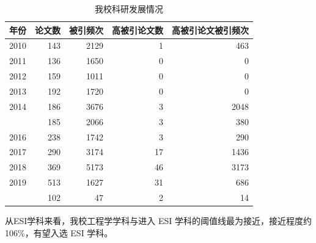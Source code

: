 \documentclass[cn, 11pt, fancy, hide]{elegantbook}
\begin{document}
\begin{table}[!h]

\caption{\label{tab:unnamed-chunk-23}我校科研发展情况}
\centering
\begin{tabular}[t]{lrrrr}
\toprule
年份 & 论文数 & 被引频次 & 高被引论文数 & 高被引论文被引频次\\
\midrule
2010 & 143 & 2129 & 1 & 463\\
2011 & 136 & 1650 & 0 & 0\\
2012 & 159 & 1011 & 0 & 0\\
2013 & 192 & 1720 & 0 & 0\\
2014 & 186 & 3676 & 3 & 2048\\
\addlinespace
2015 & 185 & 2066 & 3 & 380\\
2016 & 238 & 1742 & 3 & 290\\
2017 & 290 & 3174 & 17 & 1436\\
2018 & 369 & 5173 & 46 & 3173\\
2019 & 513 & 1627 & 31 & 686\\
\addlinespace
2020 & 102 & 47 & 2 & 14\\
\bottomrule
\end{tabular}
\end{table}

从ESI学科来看，我校工程学学科与进入 ESI 学科的阈值线最为接近，接近程度约 106\%，有望入选 ESI 学科。
\end{document}
